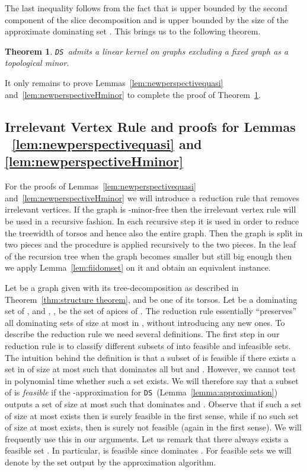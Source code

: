 \documentclass[11pt]{article}
\newtheorem{theorem}{Theorem}
\newcommand{\tDS}{{\texttt{\sc DS}}}
\begin{document}
The last inequality follows from the fact that  is upper bounded by the second component of the slice decomposition and   is upper bounded by the size of the approximate dominating set . This brings us to the following theorem. 
\begin{theorem}
\label{thm:lineardomsettopo}
\tDS \, admits a linear kernel on graphs excluding a fixed graph  as a topological minor. 
\end{theorem}

It only remains to prove Lemmas~\ref{lem:newperspectivequasi} and~\ref{lem:newperspectiveHminor} to complete the proof of 
Theorem~\ref{thm:lineardomsettopo}. 


\subsection{Irrelevant Vertex Rule and proofs for  Lemmas ~\ref{lem:newperspectivequasi} and \ref{lem:newperspectiveHminor}}
For the proofs of  Lemmas~\ref{lem:newperspectivequasi} and~\ref{lem:newperspectiveHminor} we will introduce a reduction rule that removes irrelevant vertices. 
If the graph  is -minor-free then the irrelevant vertex rule  will be used in a recursive fashion. 
In each recursive step it is used in order to reduce the treewidth of torsos and hence also the entire graph. Then the graph 
is split in two pieces and the procedure is applied recursively to the two pieces. In the leaf of the recursion tree when the graph becomes 
smaller but still big enough then we apply Lemma~\ref{lem:fiidomset} on it and obtain an equivalent instance. 




Let  be  a graph given with its  tree-decomposition  
as described in Theorem~\ref{thm:structure theorem}, and  be one of its torsos. Let  be a dominating set of , and , , be the set of apices of . The reduction rule essentially ``preserves'' all dominating sets of size at most  in , without introducing any new ones. 
To describe the reduction rule we need several definitions. 
The first step in our reduction rule is to classify different subsets  of  into feasible and infeasible sets. The intuition behind the definition is that a subset  of  is feasible if there exists a set  in  of size at most   such that  dominates all but  and   . However, we cannot test in polynomial time whether such a set  exists. We will therefore say that a subset  of  is {\em feasible} if the -approximation for \tDS \, (Lemma~\ref{lemma:approximation}) 
outputs a set  of size at most  such that   dominates  and . Observe that if such a set  of size at most  exists then  is surely feasible in the first sense, while if no such set  of size at most  exists, then  is surely not feasible (again in the first sense). We will frequently use this in our arguments. Let us remark that there always exists a feasible set . In particular,  is feasible since  dominates . For feasible sets  we will denote by  the set  output by the approximation algorithm.
\end{document}

